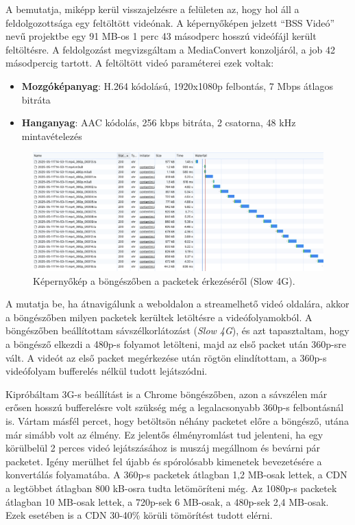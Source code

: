 A  bemutatja, miképp kerül visszajelzésre a felületen az, hogy hol áll a feldolgozottsága egy feltöltött videónak. A képernyőképen jelzett ``BSS Videó'' nevű projektbe egy 91 MB-os 1 perc 43 másodperc hosszú videófájl került feltöltésre. A feldolgozást megvizsgáltam a MediaConvert konzoljáról, a job 42 másodpercig tartott. A feltöltött videó paraméterei ezek voltak:

\begin{itemize}
  \setlength{\itemsep}{1pt}
  \setlength{\parskip}{0pt}
  \setlength{\parsep}{0pt}
  \item \textbf{Mozgóképanyag}: H.264 kódolású, 1920x1080p felbontás, 7 Mbps átlagos bitráta
  \item \textbf{Hanganyag}: AAC kódolás, 256 kbps bitráta, 2 csatorna, 48 kHz mintavételezés
\end{itemize}

\begin{figure}[h]
  \centering
  \includegraphics[width=150mm, keepaspectratio]{figures/browser_slow4g.png}
  \caption{Képernyőkép a böngészőben a packetek érkezéséről (Slow 4G).}
  \label{fig:slow4g}
\end{figure}

A  mutatja be, ha átnavigálunk a weboldalon a streamelhető videó oldalára, akkor a böngészőben milyen packetek kerültek letöltésre a videófolyamokból. A böngészőben beállítottam sávszélkorlátozást (\emph{Slow 4G}), és azt tapasztaltam, hogy a böngésző elkezdi a 480p-s folyamot letölteni, majd az első packet után 360p-sre vált. A videót az első packet megérkezése után rögtön elindítottam, a 360p-s videófolyam bufferelés nélkül tudott lejátszódni.

Kipróbáltam 3G-s beállítást is a Chrome böngészőben, azon a sávszélen már erősen hosszú bufferelésre volt szükség még a legalacsonyabb 360p-s felbontásnál is. Vártam másfél percet, hogy betöltsön néhány packetet előre a böngésző, utána már simább volt az élmény. Ez jelentős élményromlást tud jelenteni, ha egy körülbelül 2 perces videó lejátszásához is muszáj megállnom és bevárni pár packetet. Igény merülhet fel újabb és spórolósabb kimenetek bevezetésére a konvertálás folyamatába.
A 360p-s packetek átlagban 1,2 MB-osak lettek, a CDN a legtöbbet átlagban 800 kB-osra tudta letömöríteni még. Az 1080p-s packetek átlagban 10 MB-osak lettek, a 720p-sek 6 MB-osak, a 480p-sek 2,4 MB-osak. Ezek esetében is a CDN 30-40\% körüli tömörítést tudott elérni.


